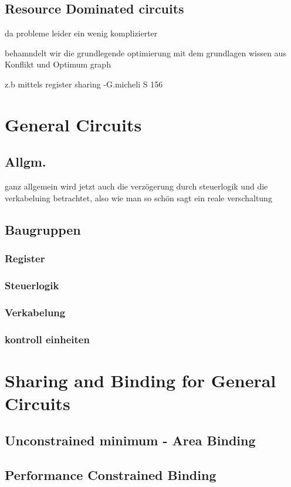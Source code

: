 \documentclass[conference]{IEEEtran}
\begin{document}
\subsection{Resource Dominated circuits}
da probleme leider ein wenig komplizierter 

behamndelt wir die grundlegende optimierung mit dem grundlagen wissen aus Konflikt und Optimum graph 

z.b mittels register sharing
-G.micheli S 156 
\section{General Circuits}
\subsection{Allgm.}

ganz allgemein wird jetzt auch die verzögerung durch steuerlogik und die verkabeluing betrachtet, also wie man so schön sagt ein reale verschaltung
\subsection{Baugruppen}
 \subsubsection{Register}
 \subsubsection{Steuerlogik}
 \subsubsection{Verkabelung}
 \subsubsection{kontroll einheiten}
\section{Sharing and Binding for General Circuits}
\subsection{Unconstrained minimum - Area Binding}
\subsection{Performance Constrained Binding}
\end{document}
